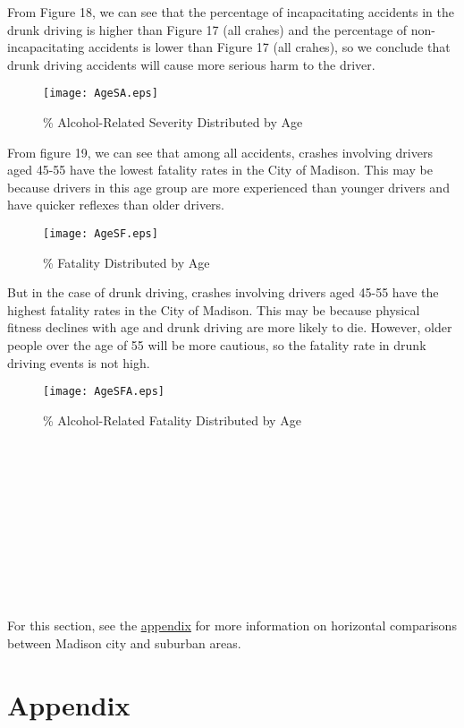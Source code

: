 \documentclass[15pt]{article}
\begin{document}
\newpage
From Figure 18, we can see that the percentage of incapacitating accidents in the drunk driving is higher than Figure 17 (all crahes) and the percentage of non-incapacitating accidents is lower than Figure 17 (all crahes), so we conclude that drunk driving accidents will cause more serious harm to the driver.
\begin{figure}[H]
\flushleft
\texttt{[image: AgeSA.eps]}
\caption{\% Alcohol-Related Severity Distributed by Age}
\label{20}
\end{figure}

\newpage
From figure 19, we can see that among all accidents, crashes involving drivers aged 45-55 have the lowest fatality rates in the City of Madison. This may be because drivers in this age group are more experienced than younger drivers and have quicker reflexes than older drivers.
\begin{figure}[H]
\flushleft
\texttt{[image: AgeSF.eps]}
\caption{\% Fatality Distributed by Age}
\label{21}
\end{figure}

\newpage
But in the case of drunk driving, crashes involving drivers aged 45-55 have the highest fatality rates in the City of Madison. This may be because physical fitness declines with age and drunk driving are more likely to die. However, older people over the age of 55 will be more cautious, so the fatality rate in drunk driving events is not high.
\begin{figure}[H]
\flushleft
\texttt{[image: AgeSFA.eps]}
\caption{\% Alcohol-Related Fatality Distributed by Age}
\label{22}
\end{figure}

~\\
~\\
~\\
~\\
~\\
~\\
~\\
~\\
~\\
~\\
\label{sec:How}
For this section, see the \hyperref[sec:How1]{\color{blue} \underline {appendix}} for more information on horizontal comparisons between Madison city and suburban areas.

\newpage
\section{Appendix}
\end{document}

